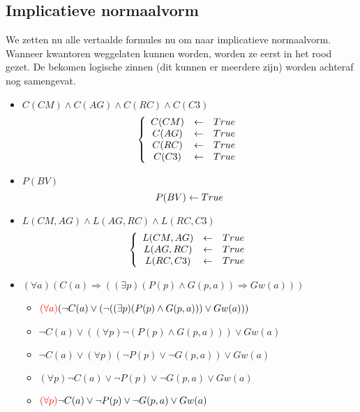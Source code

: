 \documentclass[alternative-exam.tex]{subfiles}
\begin{document}
\subsection{Implicatieve normaalvorm}
We zetten nu alle vertaalde formules nu om naar implicatieve normaalvorm.
Wanneer kwantoren weggelaten kunnen worden, worden ze eerst in het rood gezet. De bekomen logische zinnen (dit kunnen er meerdere zijn) worden achteraf nog samengevat.
\begin{itemize}
\item $C(CM)\wedge C(AG)\wedge C(RC)\wedge C(C3)$
\[
\left\{
\begin{array}{c c c}
C(CM) &\leftarrow& True\\
C(AG) &\leftarrow& True\\
C(RC) &\leftarrow& True\\
C(C3) &\leftarrow& True\\
\end{array}
\right.
\]

\item $P(BV)$
\[
P(BV) \leftarrow True\\
\]

\item $L(CM,AG) \wedge L(AG,RC) \wedge L(RC,C3)$
\[
\left\{
\begin{array}{c c c}
L(CM,AG) &\leftarrow& True\\
L(AG,RC) &\leftarrow& True\\
L(RC,C3) &\leftarrow& True\\
\end{array}
\right.
\]

\item $(\forall a)(C(a) \Rightarrow ((\exists p) (P(p) \wedge G(p,a)) \Rightarrow Gw(a)))$
\begin{itemize}
\item $ {\color{red}(\forall a)} (\neg C(a) \vee (\neg ((\exists p)(P(p)\wedge G(p,a))) \vee Gw(a)))$

\item $\neg C(a) \vee ((\forall p)\neg(P(p)\wedge G(p,a))) \vee Gw(a)$

\item $\neg C(a) \vee (\forall p)(\neg P(p)\vee \neg G(p,a)) \vee Gw(a)$

\item $(\forall p) \neg C(a) \vee \neg P(p) \vee \neg G(p,a) \vee Gw(a)$

\item ${\color{red}(\forall p)} \neg C(a) \vee \neg P(p) \vee \neg G(p,a) \vee Gw(a)$


\end{itemize}
\end{itemize}
\end{document}
